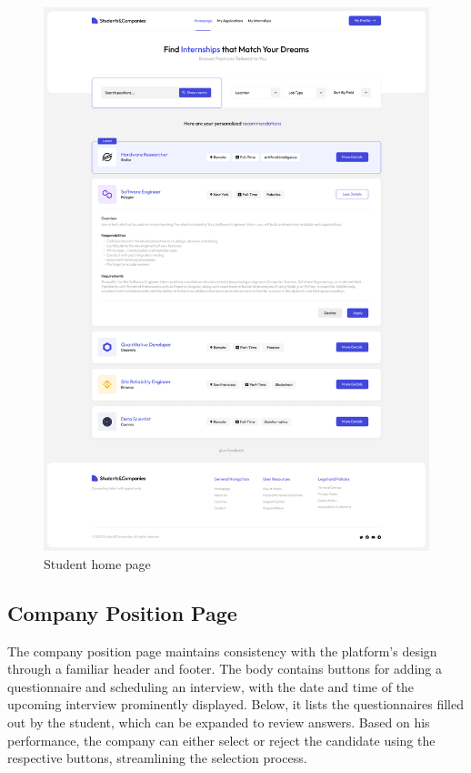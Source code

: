 \begin{figure}
    \centering
    \includegraphics[width=15cm]{images/selected-pages/student-home-page.png}
    \caption{Student home page}
\end{figure}

\subsection{Company Position Page}
The company position page maintains consistency with the platform's design through a familiar header and footer.
The body contains buttons for adding a questionnaire and scheduling an interview, with the date and time of the upcoming interview prominently displayed.
Below, it lists the questionnaires filled out by the student, which can be expanded to review answers.
Based on his performance, the company can either select or reject the candidate using the respective buttons, streamlining the selection process.

